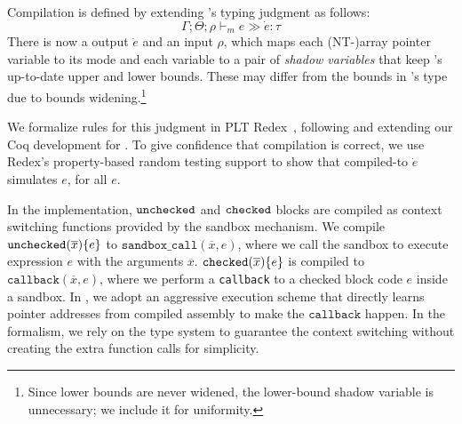 {Compilation is defined by extending \lang's
typing judgment as follows:
\[\Gamma;\Theta;\rho \vdash_m e \gg \dot e:\tau\]
There is now a \elang output $\dot e$ and an input $\rho$, which maps
each (NT-)array pointer variable to its mode and
each variable  to a pair of \emph{shadow
  variables} that keep 's up-to-date upper and lower bounds. 
These may differ from the bounds in 's type due to bounds
widening.\footnote{Since lower bounds are never widened, the
  lower-bound shadow variable is unnecessary; we include it for uniformity.} 


We formalize rules for this judgment in PLT Redex~\cite{pltredex},
following and extending our Coq development for \lang. To give
confidence that compilation is correct, we use Redex's property-based
random testing support to show that compiled-to $\dot e $ simulates
$e$, for all $e$.

%
In the \systemname implementation,
$\mathtt{unchecked}$ and $\mathtt{checked}$ blocks 
are compiled as context switching functions provided by the sandbox mechanism.
We compile $\mathtt{unchecked}({\overline{x}})\{e\}$ to 
$\texttt{sandbox\_call}(\overline{x},e)$, where we call the sandbox 
to execute expression $e$ with the arguments $\overline{x}$.
$\mathtt{checked}({\overline{x}}){\{e\}}$ is compiled to 
$\texttt{callback}(\overline{x},e)$, where we perform 
a \texttt{callback} to a checked block code $e$ inside a sandbox.
In \systemname, we adopt an aggressive execution scheme that
directly learns pointer addresses from compiled assembly to make the $\texttt{callback}$ happen.
In the formalism, we rely on the type system to 
guarantee the context switching without creating the extra function calls for simplicity.


}

